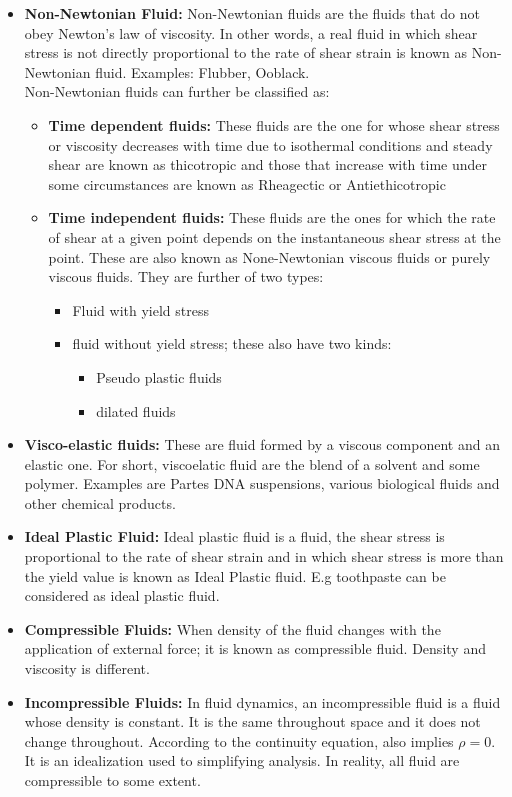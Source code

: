 \documentclass[11pt]{report}
\newcommand{\bt}[1]{\textbf{#1}}
\begin{document}
\begin{itemize}[label=--]
		\item\bt{Non-Newtonian Fluid:} Non-Newtonian fluids are the fluids that do not obey Newton's law of viscosity. In other words, a real fluid in which shear stress is not directly proportional to the rate of shear strain is known as Non-Newtonian fluid. Examples: Flubber, Ooblack.\\
		Non-Newtonian fluids can further be classified as:
		\begin{itemize}
			\item \bt{Time dependent fluids:} These fluids are the one for whose shear stress or viscosity decreases with time due to isothermal conditions and steady shear are known as thicotropic and those that increase with time under some circumstances are known as Rheagectic or Antiethicotropic
			
			\item \bt{Time independent fluids:} These fluids are the ones for which the rate of shear at a given point depends on the instantaneous shear stress at the point. These are also known as None-Newtonian viscous fluids or purely viscous fluids. They are further of two types:
			\begin{itemize}
				\item Fluid with yield stress
				\item fluid without yield stress; these also have two kinds:
				\begin{itemize}
					\item Pseudo plastic fluids
					\item dilated fluids
				\end{itemize}
			\end{itemize}
		\end{itemize}
	
		\item \bt{Visco-elastic fluids:} These are fluid formed by a viscous component and an elastic one. For short, viscoelatic fluid are the blend of a solvent and some polymer. Examples are Partes DNA suspensions, various biological fluids and other chemical products.
		
		\item\bt{Ideal Plastic Fluid:} Ideal plastic fluid is a fluid, the shear stress is proportional to the rate of shear strain and in which shear stress is more than the yield value is known as Ideal Plastic fluid. E.g toothpaste can be considered as ideal plastic fluid.
		
		\item\bt{Compressible Fluids:} When density of the fluid changes with the application of external force; it is known as compressible fluid. Density and viscosity is different.
		
		\item\bt{Incompressible Fluids:} In fluid dynamics, an incompressible fluid is a fluid whose density is constant. It is the same throughout space and it does not change throughout. According to the continuity equation, also implies $\rho=0$. It is an idealization used to simplifying analysis. In reality, all fluid are compressible to some extent.
	\end{itemize}
\end{document}
